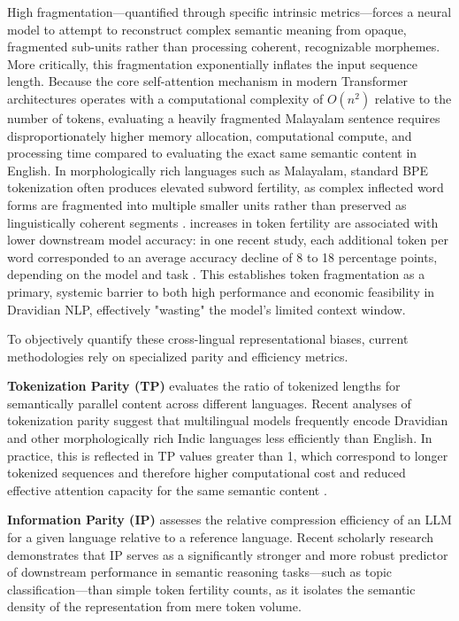 \documentclass[12pt]{article}
\begin{document}
High fragmentation—quantified through specific intrinsic metrics—forces a neural model to attempt to reconstruct complex semantic meaning from opaque, fragmented sub-units rather than processing coherent, recognizable morphemes. More critically, this fragmentation exponentially inflates the input sequence length. Because the core self-attention mechanism in modern Transformer architectures operates with a computational complexity of $O(n^2)$ relative to the number of tokens, evaluating a heavily fragmented Malayalam sentence requires disproportionately higher memory allocation, computational compute, and processing time compared to evaluating the exact same semantic content in English. In morphologically rich languages such as Malayalam, standard BPE tokenization often produces elevated subword fertility, as complex inflected word forms are fragmented into multiple smaller units rather than preserved as linguistically coherent segments \cite{rana2025indicsupertokenizer,sharma2025multilingual}. increases in token fertility are associated with lower downstream model accuracy: in one recent study, each additional token per word corresponded to an average accuracy decline of 8 to 18 percentage points, depending on the model and task \cite{lundin2025tokentax}. This establishes token fragmentation as a primary, systemic barrier to both high performance and economic feasibility in Dravidian NLP, effectively "wasting" the model's limited context window. 

To objectively quantify these cross-lingual representational biases, current methodologies rely on specialized parity and efficiency metrics. 

\textbf{Tokenization Parity (TP)} evaluates the ratio of tokenized lengths for semantically parallel content across different languages. Recent analyses of tokenization parity suggest that multilingual models frequently encode Dravidian and other morphologically rich Indic languages less efficiently than English. In practice, this is reflected in TP values greater than 1, which correspond to longer tokenized sequences and therefore higher computational cost and reduced effective attention capacity for the same semantic content \cite{ahia2025tokenizationbias,sharma2025multilingual}.

\textbf{Information Parity (IP)} assesses the relative compression efficiency of an LLM for a given language relative to a reference language. Recent scholarly research demonstrates that IP serves as a significantly stronger and more robust predictor of downstream performance in semantic reasoning tasks—such as topic classification—than simple token fertility counts, as it isolates the semantic density of the representation from mere token volume. 
\end{document}

